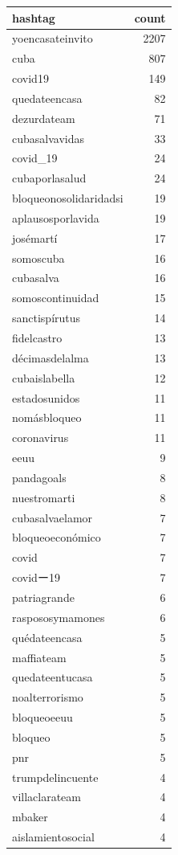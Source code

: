 \begin{tabular}{lr}
\toprule
hashtag & count \\
\midrule
yoencasateinvito & 2207 \\
cuba & 807 \\
covid19 & 149 \\
quedateencasa & 82 \\
dezurdateam & 71 \\
cubasalvavidas & 33 \\
covid\_19 & 24 \\
cubaporlasalud & 24 \\
bloqueonosolidaridadsi & 19 \\
aplausosporlavida & 19 \\
josémartí & 17 \\
somoscuba & 16 \\
cubasalva & 16 \\
somoscontinuidad & 15 \\
sanctispírutus & 14 \\
fidelcastro & 13 \\
décimasdelalma & 13 \\
cubaislabella & 12 \\
estadosunidos & 11 \\
nomásbloqueo & 11 \\
coronavirus & 11 \\
eeuu & 9 \\
pandagoals & 8 \\
nuestromarti & 8 \\
cubasalvaelamor & 7 \\
bloqueoeconómico & 7 \\
covid & 7 \\
covidー19 & 7 \\
patriagrande & 6 \\
raspososymamones & 6 \\
quédateencasa & 5 \\
maffiateam & 5 \\
quedateentucasa & 5 \\
noalterrorismo & 5 \\
bloqueoeeuu & 5 \\
bloqueo & 5 \\
pnr & 5 \\
trumpdelincuente & 4 \\
villaclarateam & 4 \\
mbaker & 4 \\
aislamientosocial & 4 \\

\end{tabular}
